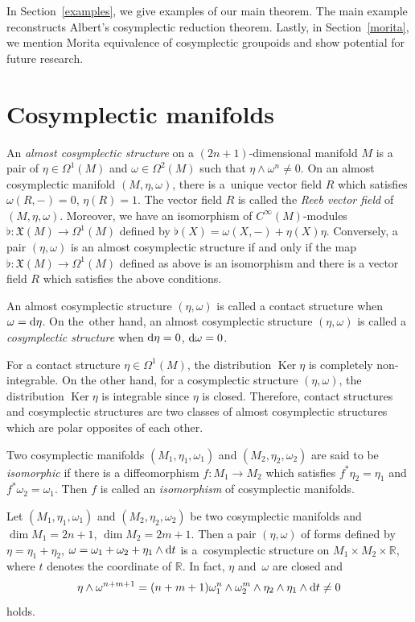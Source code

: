 \documentclass[pdftex]{sigma}
\numberwithin{equation}{section}
\begin{document}
In Section~\ref{examples}, we give examples of our main theorem. The main example reconstructs Albert's cosymplectic reduction theorem. Lastly, in Section~\ref{morita}, we mention Morita equivalence of cosymplectic groupoids and show potential for future research.


\section{Cosymplectic manifolds}\label{cosymplectic}
An \textit{almost cosymplectic structure} on a $(2n+1)$-dimensional manifold $M$ is a pair of $\eta\in\Omega^1(M)$ and $\omega\in\Omega^2(M)$ such that $\eta\wedge\omega^n\neq0$. On an almost cosymplectic manifold $(M,\eta,\omega)$, there is a~unique vector field $R$ which satisfies
$\omega(R,-)=0$, $\eta(R)=1$.
The vector field $R$ is called the \textit{Reeb vector field} of $(M,\eta,\omega)$. Moreover, we have an isomorphism of $C^\infty(M)$-modules $\flat\colon\mathfrak{X}(M)\to \Omega^1(M)$ defined by $\flat(X)=\omega(X,-)+\eta(X)\eta$. Conversely, a pair $(\eta,\omega)$ is an almost cosymplectic structure if and only if the map $\flat\colon\mathfrak{X}(M)\to \Omega^1(M)$ defined as above is an isomorphism and there is a vector field $R$ which satisfies the above conditions.

An almost cosymplectic structure $(\eta,\omega)$ is called a contact structure when $\omega={\rm d}\eta$.
On the~other hand, an almost cosymplectic structure $(\eta,\omega)$ is called a \textit{cosymplectic structure} when ${{\rm d}\eta=0}$, $ {\rm d}\omega=0$.

For a contact structure $\eta\in\Omega^1(M)$, the distribution $\operatorname{Ker}\eta$ is completely non-integrable. On the other hand, for a cosymplectic structure $(\eta,\omega)$, the distribution $\operatorname{Ker}\eta$ is integrable since $\eta$ is closed. Therefore, contact structures and cosymplectic structures are two classes of almost cosymplectic structures which are polar opposites of each other.


Two cosymplectic manifolds $(M_1,\eta_1,\omega_1)$ and $(M_2,\eta_2,\omega_2)$ are said to be \textit{isomorphic} if there is a diffeomorphism $f\colon M_1\to M_2$ which satisfies $f^\ast\eta_2=\eta_1$ and $f^\ast\omega_2=\omega_1$. Then $f$ is called an \textit{isomorphism} of cosymplectic manifolds.


Let $(M_1,\eta_1,\omega_1)$ and $(M_2,\eta_2,\omega_2)$ be two cosymplectic manifolds and $\dim M_1=2n+1$, $\dim M_2=2m+1$. Then a pair $(\eta,\omega)$ of forms defined by
$\eta=\eta_1+\eta_2$, $\omega=\omega_1+\omega_2+\eta_1\wedge {\rm d}t$
is a~cosymplectic structure on $M_1\times M_2\times\mathbb{R}$, where $t$ denotes the coordinate of $\mathbb{R}$. In fact, $\eta$ and~$\omega$ are closed and
\[\eta\wedge\omega^{n+m+1}=(n+m+1)\omega_1^n\wedge\omega_2^m\wedge\eta_2\wedge\eta_1\wedge {\rm d}t\neq0\]
holds.
\end{document}
